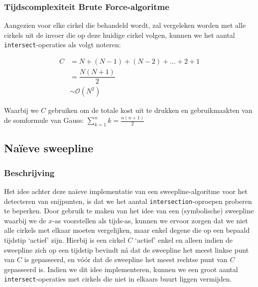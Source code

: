 \documentclass[12pt]{article}
\begin{document}
\subsubsection{Tijdscomplexiteit Brute Force-algoritme}
Aangezien voor elke cirkel die behandeld wordt, zal vergeleken worden met alle cirkels uit de invoer die op deze huidige cirkel volgen, kunnen we het aantal \texttt{intersect}-operaties als volgt noteren:

\begin{align*}
C &= N + (N-1) + (N-2) + \ldots + 2 + 1\\
&= \dfrac{N(N+1)}{2}\\
&\sim \mathcal{O}(N^2)
\end{align*}


Waarbij we $ C $ gebruiken om de totale kost uit te drukken en gebruikmaakten van de somformule van Gauss: $ \sum_{k=1}^{n} k = \frac{n(n+1)}{2}$ 

\subsection{Naïeve sweepline}
\subsubsection{Beschrijving}

Het idee achter deze naïeve implementatie van een sweepline-algoritme voor het detecteren van snijpunten, is dat we het aantal \texttt{intersection}-oproepen proberen te beperken. Door gebruik te maken van het idee van een (symbolische) sweepline waarbij we de $ x $-as voorstellen als tijds-as, kunnen we ervoor zorgen dat we niet alle cirkels met elkaar moeten vergelijken, maar enkel degene die op een bepaald tijdstip `actief' zijn. Hierbij is een cirkel $ C $ `actief' enkel en alleen indien de sweepline zich op een tijdstip bevindt ná dat de sweepline het meest linkse punt van $ C $ is gepasseerd, en vóór dat de sweepline het meest rechtse punt van $ C $ gepasseerd is. Indien we dit idee implementeren, kunnen we een groot aantal \texttt{intersect}-operaties met cirkels die niet in elkaars buurt liggen vermijden. 
\end{document}
